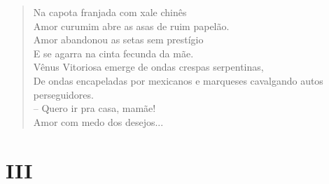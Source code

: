 \begin{verse}
Na capota franjada com xale chinês\\
Amor curumim abre as asas de ruim papelão.\\
Amor abandonou as setas sem prestígio\\
E se agarra na cinta fecunda da mãe.\\
Vênus Vitoriosa emerge de ondas crespas serpentinas,\\
De ondas encapeladas por mexicanos e marqueses cavalgando autos perseguidores.\\
-- Quero ir pra casa, mamãe!\\

Amor com medo dos desejos...
\end{verse}

\medskip
\section{III}

